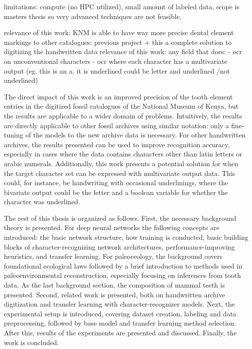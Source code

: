 \documentclass{article}
\begin{document}
limitations: compute (no HPC utilized), small amount of labeled data, scope is masters thesis so very advanced techniques are not feasible.

relevance of this work: KNM is able to have way more precise dental element markings
to other catalogues: previous project + this a complete solution to digitizing the handwritten data 
relevance of this work: any field that does:
- ocr on unconventional characters
- ocr where each character has a multivariate output (eg. this is an a. it is underlined could be letter and underlined /not underlined)

The direct impact of this work is an improved precision of the tooth element entries in the digitized 
fossil catalogues of the National Museum of Kenya, but the results are applicable to a wider domain of problems.
Intuitively, the results are directly applicable to other fossil archives using similar notation: only a fine-tuning of the 
models to the new archive data is necessary.
For other handwritten archives, the results presented can be used to improve recognition accuracy, especially in cases 
where the data contains characters other than latin letters or arabic numerals. Additionally, this work presents
a potential solution for when the target character set can be expressed with multivariate output data. This could, for 
instance, be handwriting with occasional underlinings, where the bivariate output could be the letter and a boolean variable for 
whether the character was underlined.

The rest of this thesis is organized as follows. First, the necessary background theory is 
presented. For deep neural networks the following concepts are introduced:
the basic network structure, how training is conducted, basic building blocks of character-recognizing network architectures, performance-improving 
heuristics, and transfer learning. For paleoecology, the background covers 
foundational ecological laws followed by a brief introduction to methods used in
paleoenvironmental reconstruction, especially focusing on inferences from tooth data.
As the last background section, the composition of mammal teeth is presented. 
Second, related work is presented, both on
handwritten archive digitization and transfer learning with character-recognizer models.
Next, the experimental setup is introduced, covering dataset creation, labeling and data 
preprocessing, followed by base model and transfer learning method selection. After this, 
results of the experiments are presented and discussed. Finally, the work is concluded.
\end{document}
